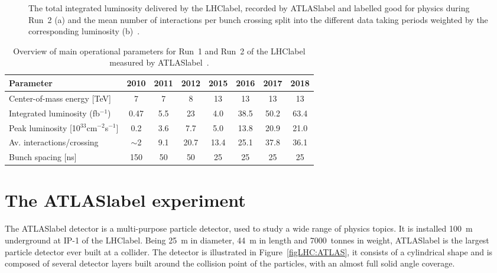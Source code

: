 \begin{figure}[htbp]
    \RawFloats
    \begin{center}
    \quad
    \caption{
        The total integrated luminosity delivered by the \acrshort{LHClabel}, recorded by \acrshort{ATLASlabel} and labelled good for physics during Run~2 (a) and the mean number of interactions per bunch crossing split into the different data taking periods weighted by the corresponding luminosity (b)~\cite{publiclumi}. 
    }
    \label{figLHC:lumipileup}
    \end{center}
\end{figure}

\begin{table}[htbp]
    \begin{tabular}{l|ccccccc}
    \toprule\toprule
    Parameter                                        & 2010    & 2011 & 2012 & 2015 & 2016 & 2017 & 2018 \\     \midrule
    Center-of-mass energy [TeV]                                  & 7       & 7    & 8    & 13   & 13   & 13   & 13   \\
    Integrated luminosity (fb$^{-1}$)      & 0.47    & 5.5  & 23   & 4.0  & 38.5 & 50.2 & 63.4 \\
    Peak luminosity [10$^{33}$cm$^{-2}$s$^{-1}$]     & 0.2     & 3.6  & 7.7  & 5.0  & 13.8 & 20.9 & 21.0 \\
    Av. interactions/crossing                        & $\sim$2 & 9.1  & 20.7 & 13.4 & 25.1 & 37.8 & 36.1 \\
    Bunch spacing [ns]                               & 150     & 50   & 50   & 25   & 25   & 25   & 25   \\
    \bottomrule\bottomrule                               
    \end{tabular}
    \caption{Overview of main operational parameters for Run~1 and Run~2 of the \acrshort{LHClabel} measured by \acrshort{ATLASlabel}~\cite{publiclumi,publiclumiRun1}.}
    \label{tabLHC:LHCparameters}
    \end{table}

\section{The \acrshort{ATLASlabel} experiment}

The \acrshort{ATLASlabel} detector is a multi-purpose particle detector, used to study a wide range of physics topics. It is installed 100~m underground at IP-1 of the \acrshort{LHClabel}. Being 25~m in diameter, 44~m in length and 7000~tonnes in weight, \acrshort{ATLASlabel} is the largest particle detector ever built at a collider. The detector is illustrated in Figure~\ref{figLHC:ATLAS}, it consists of a cylindrical shape and is composed of several detector layers built around the collision point of the particles, with an almost full solid angle coverage.


